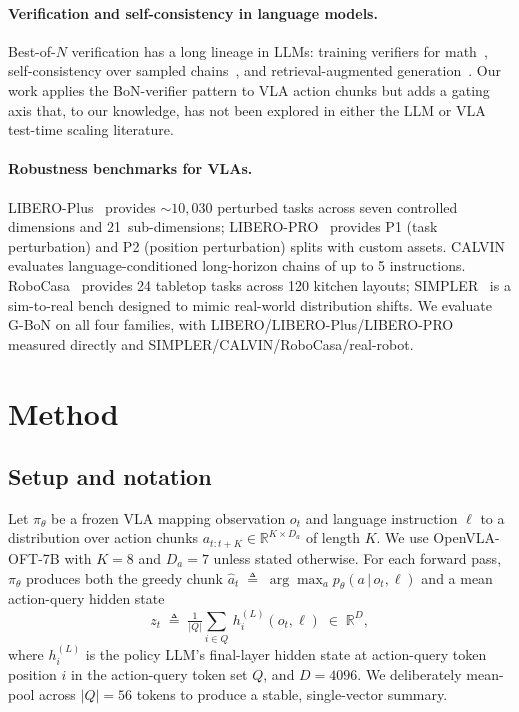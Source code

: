 \documentclass{article}
\begin{document}
\paragraph{Verification and self-consistency in language models.}
Best-of-$N$ verification has a long lineage in LLMs: training
verifiers for math~\citep{cobbe2021verifier}, self-consistency over
sampled chains~\citep{wei2022consistency}, and retrieval-augmented
generation~\citep{lewis2020rag}. Our work applies the BoN-verifier
pattern to VLA action chunks but adds a gating axis that, to our
knowledge, has not been explored in either the LLM or VLA test-time
scaling literature.

\paragraph{Robustness benchmarks for VLAs.}
LIBERO-Plus~\citep{libero_plus2025} provides $\sim 10{,}030$
perturbed tasks across seven controlled dimensions and
21~sub-dimensions; LIBERO-PRO~\citep{libero_pro2025} provides
P1 (task perturbation) and P2 (position perturbation) splits with
custom assets. CALVIN~\citep{calvin2022} evaluates language-conditioned
long-horizon chains of up to 5 instructions.
RoboCasa~\citep{robocasa2024} provides 24 tabletop tasks across 120
kitchen layouts; SIMPLER~\citep{simpler2024} is a sim-to-real bench
designed to mimic real-world distribution shifts. We evaluate G-BoN on
all four families, with LIBERO/LIBERO-Plus/LIBERO-PRO measured directly
and SIMPLER/CALVIN/RoboCasa/real-robot.

\section{Method}
\label{sec:method}

\subsection{Setup and notation}
\label{sec:method:notation}
Let $\pi_\theta$ be a frozen VLA mapping observation $o_t$ and language
instruction $\ell$ to a distribution over action chunks
$a_{t:t+K}\in\mathbb{R}^{K\times D_a}$ of length $K$. We use OpenVLA-OFT-7B
with $K{=}8$ and $D_a{=}7$ unless stated otherwise. For each forward
pass, $\pi_\theta$ produces both the greedy chunk
$\hat a_t \;\triangleq\; \arg\max_{a} p_\theta(a\,|\,o_t,\ell)$ and a
mean action-query hidden state
\[
  z_t \;\triangleq\; \tfrac{1}{|Q|}\!\sum_{i\in Q}\,h^{(L)}_i(o_t,\ell)
  \;\in\; \mathbb{R}^{D},
\]
where $h^{(L)}_i$ is the policy LLM's final-layer hidden state at
action-query token position $i$ in the action-query token set
$Q$, and $D{=}4096$. We deliberately mean-pool across $|Q|{=}56$
tokens to produce a stable, single-vector summary.
\end{document}
